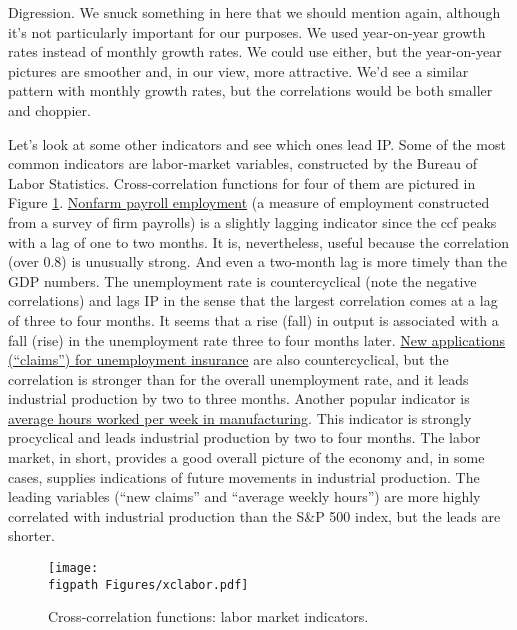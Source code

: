 Digression.
{\footnotesize We snuck something in here that we
should mention again,
although it's not particularly important for our purposes.
We used year-on-year growth rates instead of monthly
growth rates.
We could use either, but the year-on-year pictures are smoother
and, in our view, more attractive.
We'd see a similar pattern with monthly growth rates, but the correlations would be both smaller and choppier. }


Let's look at some other indicators and see which ones lead IP.
Some of the most common indicators are labor-market variables,
constructed by the Bureau of Labor Statistics.
Cross-correlation functions for four of them are pictured in
Figure \ref{fig:ccf-labor}.
\href{http://research.stlouisfed.org/fred2/series/PAYEMS}{Nonfarm payroll employment} (a measure of employment constructed
from a survey of firm payrolls) is a slightly
lagging indicator since the ccf peaks with a lag of one to two months.
It is, nevertheless, useful because the correlation (over 0.8) is
unusually strong.
And even a two-month lag is more timely than the GDP numbers.
The unemployment rate is   countercyclical   
 (note the negative correlations)
and lags IP in the sense that the largest correlation comes at a
lag of three to four months.
It seems that a rise (fall) in output is associated with a fall (rise)
in the unemployment rate three to four months later.
\href{http://research.stlouisfed.org/fred2/series/IC4WSA}{New applications (``claims'') for unemployment insurance} are also
  countercyclical, but the correlation is stronger than for
the overall unemployment rate, and it leads
industrial production by two to three months.
Another popular indicator
is \href{http://research.stlouisfed.org/fred2/series/AWHMAN}{average hours worked per week in manufacturing}.
This indicator is strongly procyclical 
 and leads industrial production
by two to four months.
The labor market, in short, provides a good overall picture of the
economy and, in some cases, supplies indications of future movements
in industrial production.
The leading variables (``new claims'' and ``average weekly hours'')
are more highly correlated with industrial production
than the S\&P 500 index, but the leads are shorter.

\begin{figure}
    \caption{Cross-correlation functions:  labor market indicators.}
    \label{fig:ccf-labor}%
    \centering
    \texttt{[image: \\figpath Figures/xclabor.pdf]}
\end{figure}


